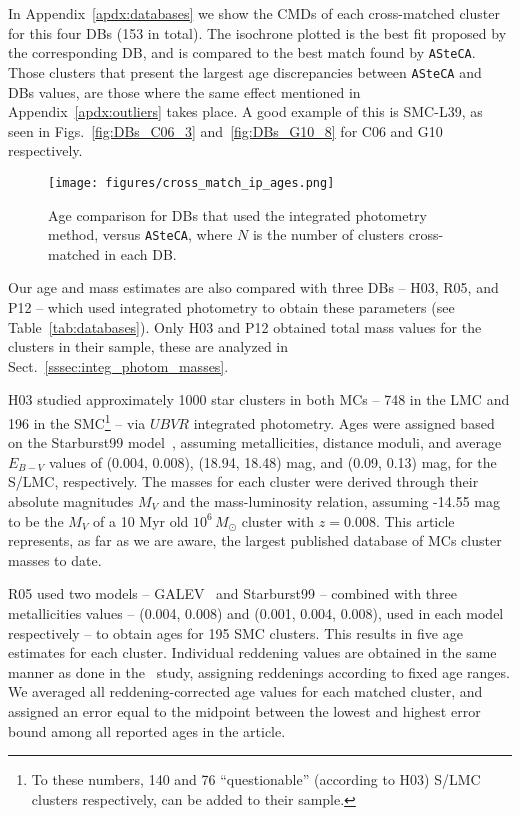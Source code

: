 \documentclass{aa}
\begin{document}
In Appendix~\ref{apdx:databases} we show the CMDs of each cross-matched cluster
for this four DBs (153 in total). The isochrone plotted is the best fit proposed
by the corresponding DB, and is compared to the best match found by
\texttt{ASteCA}.
Those clusters that present the largest age discrepancies between
\texttt{ASteCA} and DBs values, are those where the same effect mentioned in
Appendix~\ref{apdx:outliers} takes place. A good example of this is SMC-L39, as
seen in Figs.~\ref{fig:DBs_C06_3} and~\ref{fig:DBs_G10_8} for C06 and G10
respectively.\\


%

\begin{figure}
\centering
\texttt{[image: figures/cross\_match\_ip\_ages.png]}
\caption{Age comparison for DBs that used the integrated photometry
method, versus \texttt{ASteCA}, where $N$ is the number of clusters cross-matched in
each DB.\@}
\label{fig:cross_match_ip_age}
\end{figure}

Our age and mass estimates are also compared with three DBs -- H03, R05, and P12
-- which used integrated photometry to obtain these parameters (see
Table~\ref{tab:databases}). Only H03 and P12 obtained total mass values for the
clusters in their sample, these are analyzed in
Sect.~\ref{sssec:integ_photom_masses}.

H03 studied approximately 1000 star clusters in both MCs -- 748 in the LMC and
196 in the SMC\footnote{To these numbers, 140 and 76 ``questionable'' (according
to H03) S/LMC clusters respectively, can be added to their sample.} --
via $UBVR$ integrated photometry. Ages were assigned based on the Starburst99
model~\citep{Leitherer_1999}, assuming metallicities, distance moduli, and
average $E_{B-V}$ values of (0.004, 0.008), (18.94, 18.48) mag, and 
(0.09, 0.13) mag, for the S/LMC, respectively.
The masses for each cluster were derived through their absolute
magnitudes $M_V$ and the mass-luminosity relation, assuming -14.55 mag to be the
$M_V$ of a 10 Myr old $10^6\,M_{\odot}$ cluster with $z=0.008$.
This article represents, as far as we are aware, the largest
published database of MCs cluster masses to date.

R05 used two models -- GALEV~\citep{Anders_2003} and Starburst99 -- combined
with three metallicities values -- (0.004, 0.008) and (0.001, 0.004, 0.008),
used in each model respectively -- to obtain ages for 195 SMC clusters.
This results in five age estimates for each cluster. Individual reddening
values are obtained in the same manner as done in the~\cite{Harris_2004} study,
assigning reddenings according to fixed age ranges.
%
We averaged all reddening-corrected age values for each matched cluster,
and assigned an error equal to the midpoint between the lowest and
highest error bound among all reported ages in the article.
\end{document}
